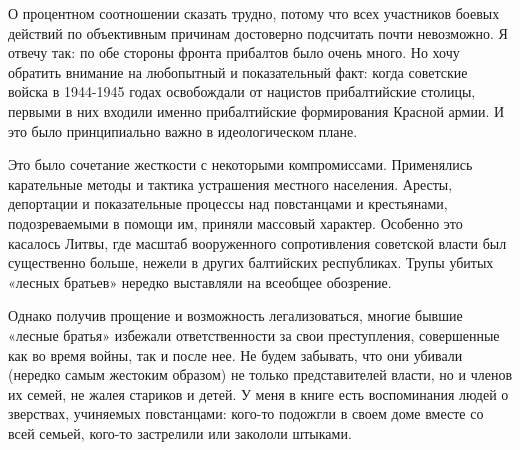 
О процентном соотношении сказать трудно, потому что всех участников боевых
действий по объективным причинам достоверно подсчитать почти невозможно. Я
отвечу так: по обе стороны фронта прибалтов было очень много. Но хочу обратить
внимание на любопытный и показательный факт: когда советские войска в 1944-1945
годах освобождали от нацистов прибалтийские столицы, первыми в них входили
именно прибалтийские формирования Красной армии. И это было принципиально важно
в идеологическом плане.


Это было сочетание жесткости с некоторыми компромиссами. Применялись
карательные методы и тактика устрашения местного населения. Аресты, депортации
и показательные процессы над повстанцами и крестьянами, подозреваемыми в помощи
им, приняли массовый характер. Особенно это касалось Литвы, где масштаб
вооруженного сопротивления советской власти был существенно больше, нежели в
других балтийских республиках. Трупы убитых «лесных братьев» нередко выставляли
на всеобщее обозрение.


Однако получив прощение и возможность легализоваться, многие бывшие «лесные
братья» избежали ответственности за свои преступления, совершенные как во время
войны, так и после нее. Не будем забывать, что они убивали (нередко самым
жестоким образом) не только представителей власти, но и членов их семей, не
жалея стариков и детей. У меня в книге есть воспоминания людей о зверствах,
учиняемых повстанцами: кого-то подожгли в своем доме вместе со всей семьей,
кого-то застрелили или закололи штыками.
